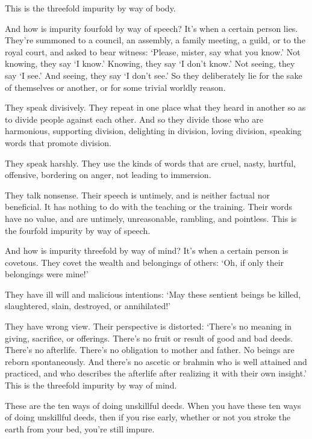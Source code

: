 \documentclass[12pt,openany]{book}%
\begin{document}
This is the threefold impurity by way of body. 

And how is impurity fourfold by way of speech? It’s when a certain person lies. They’re summoned to a council, an assembly, a family meeting, a guild, or to the royal court, and asked to bear witness: ‘Please, mister, say what you know.’ Not knowing, they say ‘I know.’ Knowing, they say ‘I don’t know.’ Not seeing, they say ‘I see.’ And seeing, they say ‘I don’t see.’ So they deliberately lie for the sake of themselves or another, or for some trivial worldly reason. 

They speak divisively. They repeat in one place what they heard in another so as to divide people against each other. And so they divide those who are harmonious, supporting division, delighting in division, loving division, speaking words that promote division. 

They speak harshly. They use the kinds of words that are cruel, nasty, hurtful, offensive, bordering on anger, not leading to immersion. 

They talk nonsense. Their speech is untimely, and is neither factual nor beneficial. It has nothing to do with the teaching or the training. Their words have no value, and are untimely, unreasonable, rambling, and pointless. This is the fourfold impurity by way of speech. 

And how is impurity threefold by way of mind? It’s when a certain person is covetous. They covet the wealth and belongings of others: ‘Oh, if only their belongings were mine!’ 

They have ill will and malicious intentions: ‘May these sentient beings be killed, slaughtered, slain, destroyed, or annihilated!’ 

They have wrong view. Their perspective is distorted: ‘There’s no meaning in giving, sacrifice, or offerings. There’s no fruit or result of good and bad deeds. There’s no afterlife. There’s no obligation to mother and father. No beings are reborn spontaneously. And there’s no ascetic or brahmin who is well attained and practiced, and who describes the afterlife after realizing it with their own insight.’ This is the threefold impurity by way of mind. 

These are the ten ways of doing unskillful deeds. When you have these ten ways of doing unskillful deeds, then if you rise early, whether or not you stroke the earth from your bed, you’re still impure. 
\end{document}
